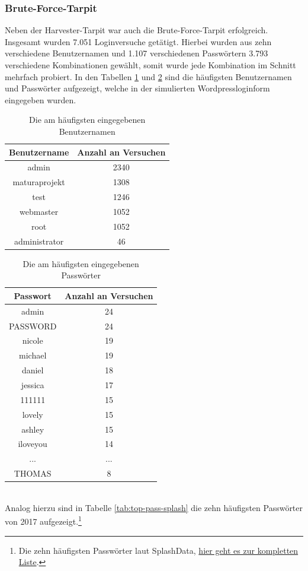 \subsubsection{Brute-Force-Tarpit}
Neben der Harvester-Tarpit war auch die Brute-Force-Tarpit erfolgreich. Insgesamt wurden 7.051 Loginversuche getätigt. Hierbei wurden aus zehn verschiedene Benutzernamen und 1.107 verschiedenen Passwörtern 3.793 verschiedene Kombinationen gewählt, somit wurde jede Kombination im Schnitt mehrfach probiert. In den Tabellen \ref{tab:top-ben} und \ref{tab:top-pass} sind die häufigsten Benutzernamen und Passwörter aufgezeigt, welche in der simulierten Wordpressloginform eingegeben wurden.
\begin{table}[htb!]
	\centering
	\begin{tabular}{c|c}
		\textbf{Benutzername}&\textbf{Anzahl an Versuchen}\\\hline
		admin & 2340\\
		maturaprojekt & 1308\\
		test & 1246 \\
		webmaster & 1052\\
		root & 1052 \\
		administrator & 46 \\
	\end{tabular}
	\caption{Die am häufigsten eingegebenen Benutzernamen}
	\label{tab:top-ben}
\end{table}
\begin{table}[htb!]
	\centering
	\begin{tabular}{c|c}
		\textbf{Passwort}&\textbf{Anzahl an Versuchen}\\\hline
		admin & 24\\
		PASSWORD & 24\\
		nicole & 19\\
		michael & 19\\
		daniel & 18\\
		jessica & 17\\
		111111 & 15\\
		lovely & 15\\
		ashley & 15\\
		iloveyou & 14\\
		... & ...\\
		THOMAS & 8\\
	\end{tabular}
	\caption{Die am häufigsten eingegebenen Passwörter}
	\label{tab:top-pass}
\end{table}
\\Analog hierzu sind in Tabelle \ref{tab:top-pass-splash} die zehn häufigsten Passwörter von 2017 aufgezeigt.\footnote{Die zehn häufigsten Passwörter laut SplashData, \href{https://13639-presscdn-0-80-pagely.netdna-ssl.com/wp-content/uploads/2017/12/Top-100-Worst-Passwords-of-2017a.pdf}{hier geht es zur kompletten Liste}.}
